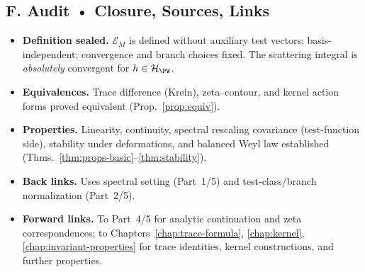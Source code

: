 \subsection*{F. Audit • Closure, Sources, Links}
\label{subsec:audit-ef}

\begin{tcolorbox}[colback=gray!3,colframe=gray!50,title=ZNB-9+++ Audit Outcome (sealed)]
\begin{itemize}
  \item \textbf{Definition sealed.} $\mathcal E_M$ is defined without auxiliary test vectors; basis-independent; convergence and branch choices fixed. The scattering integral is \emph{absolutely} convergent for $h\in\mathcal H_{\PW}$.
  \item \textbf{Equivalences.} Trace difference (Krein), zeta–contour, and kernel action forms proved equivalent (Prop.~\ref{prop:equiv}).
  \item \textbf{Properties.} Linearity, continuity, spectral rescaling covariance (test-function side), stability under deformations, and balanced Weyl law established (Thms.~\ref{thm:props-basic}–\ref{thm:stability}).
  \item \textbf{Back links.} Uses spectral setting (Part~1/5) and test-class/branch normalization (Part~2/5).
  \item \textbf{Forward links.} To Part~4/5 for analytic continuation and zeta correspondences; to Chapters~\ref{chap:trace-formula}, \ref{chap:kernel}, \ref{chap:invariant-properties} for trace identities, kernel constructions, and further properties.
\end{itemize}
\end{tcolorbox}



